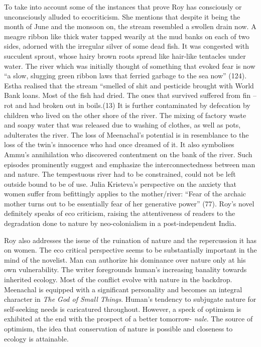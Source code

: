 To take into account some of the instances that prove Roy has consciously or unconsciously alluded to ecocriticism. She mentions that despite it being the month of June and the monsoon on, the stream resembled a swollen drain now. A meagre ribbon like thick water tapped wearily at the mud banks on each of two sides, adorned with the irregular silver of some dead fish. It was congested with succulent sprout, whose hairy brown roots spread like hair-like tentacles under water. The river which was initially thought of something that evoked fear is now “a slow, slugging green ribbon laws that ferried garbage to the sea now” (124). Estha realised that the stream “smelled of shit and pesticide brought with World Bank loans. Most of the fish had dried. The ones that survived suffered from fin –rot and had broken out in boils.(13) It is further contaminated by defecation by children who lived on the other shore of the river. The mixing of factory waste and soapy water that was released due to washing of clothes, as well as pots, adulterates the river. The loss of Meenachal’s potential is in resemblance to the loss of the twin’s innocence who had once dreamed of it. It also symbolises Ammu’s annihilation who discovered contentment on the bank of the river. Such episodes prominently suggest and emphasize the interconnectedness between man and nature. The tempestuous river had to be constrained, could not be left outside bound to be of use. Julia Kristeva’s perspective on the anxiety that women suffer from befittingly applies to the mother/river: “Fear of the archaic mother turns out to be essentially fear of her generative power” (77). Roy’s novel definitely speaks of eco criticism, raising the attentiveness of readers to the degradation done to nature by neo-colonialism in a post-independent India.

Roy also addresses the issue of the ruination of nature and the repercussion it has on women. The eco critical perspective seems to be substantially important in the mind of the novelist.  Man can authorize his dominance over nature only at his own vulnerability. The writer foregrounds human’s increasing banality towards inherited ecology. Most of the conflict evolve with nature in the backdrop. Meenachal is equipped with a significant personality and becomes an integral character in \emph{The God of Small Things}. Human’s tendency to subjugate nature for self-seeking needs is caricatured throughout. However, a speck of optimism is exhibited at the end with the prospect of a better tomorrow- \emph{nale}. The source of optimism, the idea that conservation of nature is possible and closeness to ecology is attainable. 

